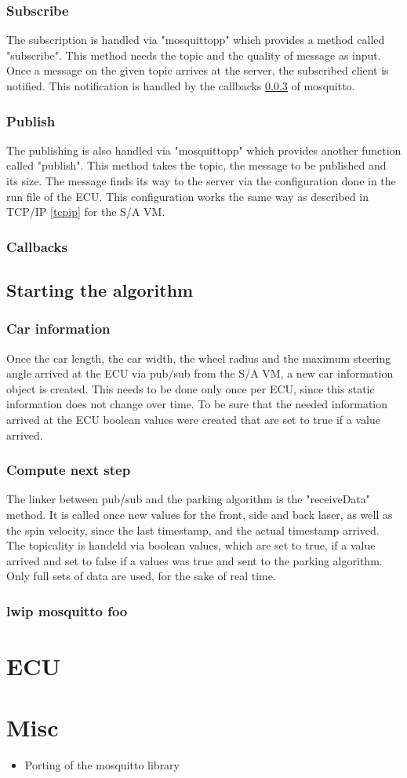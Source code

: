 \documentclass[paper=a4, fontsize=11pt]{scrartcl}
\begin{document}
  \subsubsection{Subscribe}
The subscription is handled via "mosquittopp" which provides a method called "subscribe". This method needs the topic and the quality of message as input. Once a message on the given topic arrives at the server, the subscribed client is notified. This notification is handled by the callbacks \ref{callbacks} of mosquitto.
  \subsubsection{Publish}
The publishing is also handled via "mosquittopp" which provides another function called "publish". This method takes the topic, the message to be published and its size. The message finds its way to the server via the configuration done in the run file of the ECU. This configuration works the same way as described in TCP/IP \ref{tcpip} for the S/A VM.
  \subsubsection{Callbacks} \label{callbacks}
  \subsection{Starting the algorithm}
  \subsubsection{Car information}
Once the car length, the car width, the wheel radius and the maximum steering angle arrived at the ECU via pub/sub from the S/A VM, a new car information object is created. This needs to be done only once per ECU, since this static information does not change over time.
To be sure that the needed information arrived at the ECU boolean values were created that are set to true if a value arrived.
  \subsubsection{Compute next step}
The linker between pub/sub and the parking algorithm is the "receiveData" method. It is called once new values for the front, side and back laser, as well as the spin velocity, since the last timestamp, and the actual timestamp arrived. The topicality is handeld via boolean values, which are set to true, if a value arrived and set to false if a values was true and sent to the parking algorithm. Only full sets of data are used, for the sake of real time.
  \subsubsection{lwip mosquitto foo}
\section{ECU}
\section{Misc}
\begin{itemize}
  \item Porting of the mosquitto library %
\end{itemize}
\end{document}
